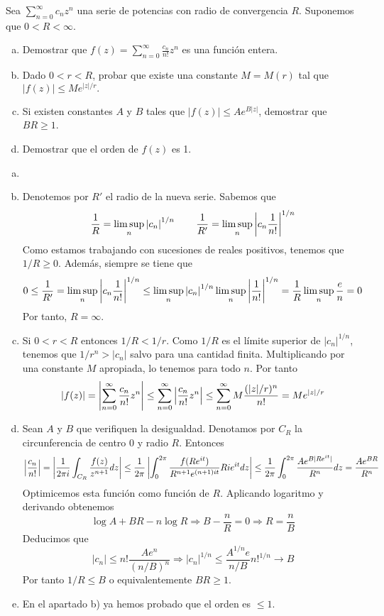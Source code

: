 \documentclass[twoside]{article}
\begin{document}
\newpage
\begin{ejercicio}{3}
Sea $\sum_{n=0}^\infty c_n z^n$ una serie de potencias con  radio de convergencia  $R$. Suponemos que $0<R<\infty$.  
\begin{enumerate}[a)]
\item  Demostrar que 
$\displaystyle{f(z)=\sum_{n=0}^\infty \frac{c_n}{n!}z^n}$
es una función  entera. 
\item  Dado $0<r<R$, probar que existe una constante $M=M(r)$ tal que 
$|f(z)|\le Me^{|z|/r}.$
\item  Si existen constantes $A$ y $B$ tales que $|f(z)|\le A e^{B|z|}$, demostrar que 
$BR\ge 1$.
\item Demostrar que el orden de $f(z)$ es 1.
\end{enumerate}
\end{ejercicio}
\begin{solucion}
\begin{enumerate}[a)]
\item[]
\item Denotemos por $R'$ el radio de la nueva serie. Sabemos que
$$
\frac{1}{R} = \limsup_n \left\lvert c_n\right\rvert^{1/n} \qquad\frac{1}{R'} = \limsup_n \left\lvert c_n\frac{1}{n!}\right\rvert^{1/n}
$$
Como estamos trabajando con sucesiones de reales positivos, tenemos que $1/R\geq 0$. Además, siempre se tiene que
$$
0\leq \frac{1}{R'}=\limsup_n \left\lvert c_n\frac{1}{n!}\right\rvert^{1/n} \leq \limsup_n \left\lvert c_n\right\rvert^{1/n}\limsup_n\left\lvert\frac{1}{n!}\right\rvert^{1/n} = \frac{1}{R}\limsup_n \frac{e}{n} = 0
$$
Por tanto, $R=\infty$.
\item Si $0<r<R$ entonces $1/R < 1/r$. Como $1/R$ es el límite superior de $|c_n|^{1/n}$, tenemos que $1/r^n > |c_n|$ salvo para una cantidad finita. Multiplicando por una constante $M$ apropiada, lo tenemos para todo $n$. Por tanto
$$
|f(z)| = \left\lvert\sum_{n=0}^\infty \frac{c_n}{n!}z^n\right\rvert\leq \sum_{n=0}^\infty \left\lvert\frac{c_n}{n!}z^n\right\rvert \leq \sum_{n=0}^\infty M{\frac{(|z|/r)^n}{n!}} = Me^{|z|/r}
$$
\item Sean $A$ y $B$ que verifiquen la desigualdad. Denotamos por $C_R$ la circunferencia de centro $0$ y radio $R$. Entonces
$$
\left\lvert\frac{c_n}{n!}\right\rvert = \left\lvert\frac{1}{2\pi i}\int_{C_R}\frac{f(z)}{z^{n+1}}dz\right\rvert \leq \frac{1}{2\pi} \left\lvert\int_0^{2\pi}\frac{f(Re^{it})}{R^{n+1}e^{(n+1)it}}Rie^{it}dz\right\rvert \leq \frac{1}{2\pi}\int_0^{2\pi}\frac{Ae^{B|Re^{it}|}}{R^{n}}dz = \frac{Ae^{BR}}{R^n}
$$
Optimicemos esta función como función de $R$. Aplicando logaritmo y derivando obtenemos
$$
\log A + BR - n \log R \Rightarrow B - \frac{n}{R} = 0 \Rightarrow R = \frac{n}{B}
$$
Deducimos que
$$
|c_n| \leq n!\frac{Ae^n}{(n/B)^n} \Rightarrow |c_n|^{1/n} \leq \frac{A^{1/n}e}{n/B}n!^{1/n} \to B 
$$
Por tanto $1/R \leq B$ o equivalentemente $BR\geq 1$.
\item En el apartado b) ya hemos probado que el orden es $\leq 1$.
\end{enumerate}
\end{solucion}
\end{document}
